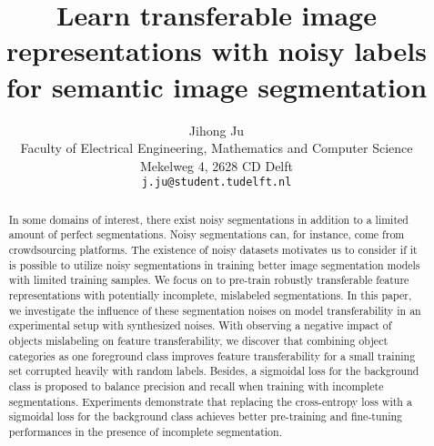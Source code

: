 \documentclass[10pt,twocolumn,letterpaper]{article}
\begin{document}
\onecolumn
{}


\twocolumn
{}
\newpage
\title{Learn transferable image representations with noisy labels for semantic image segmentation}

\author{Jihong Ju\\
Faculty of Electrical Engineering, Mathematics and Computer Science \\
Mekelweg 4, 2628 CD Delft\\
{\tt\small j.ju@student.tudelft.nl}
}

\maketitle


\begin{abstract}


In some domains of interest, there exist noisy segmentations in addition to a limited amount of perfect segmentations.
Noisy segmentations can, for instance, come from crowdsourcing platforms.
The existence of noisy datasets motivates us to consider if it is possible to utilize noisy segmentations in training better image segmentation models with limited training samples.
We focus on to pre-train robustly transferable feature representations with potentially incomplete, mislabeled segmentations.
In this paper, we investigate the influence of these segmentation noises on model transferability in an experimental setup with synthesized noises.
With observing a negative impact of objects mislabeling on feature transferability, we discover that combining object categories as one foreground class improves feature transferability for a small training set corrupted heavily with random labels.
Besides, a sigmoidal loss for the background class is proposed to balance precision and recall when training with incomplete segmentations.
Experiments demonstrate that replacing the cross-entropy loss with a sigmoidal loss for the background class achieves better pre-training and fine-tuning performances in the presence of incomplete segmentation.


\end{abstract}
\end{document}
